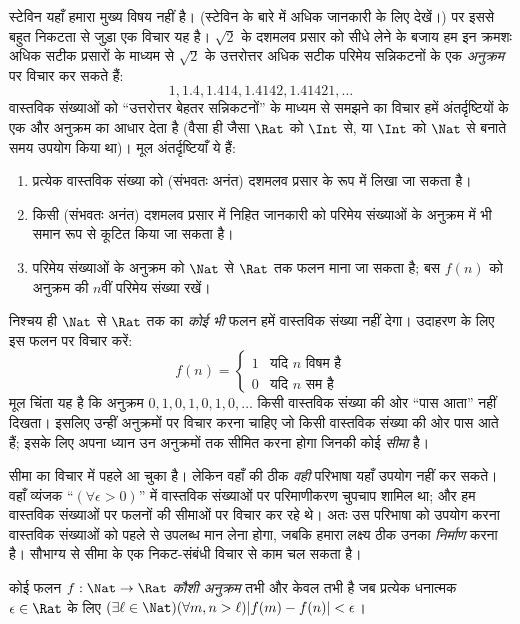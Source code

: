 \documentclass[../../../include/open-logic-section]{subfiles}
\begin{document}
स्टेविन यहाँ हमारा मुख्य विषय नहीं है। (स्टेविन के बारे में अधिक जानकारी के
लिए \citealt{KatzKatz2012} देखें।) पर इससे बहुत निकटता से जुड़ा एक विचार यह है।
$\sqrt{2}$ के दशमलव प्रसार को सीधे लेने के बजाय हम इन क्रमशः अधिक सटीक प्रसारों
के माध्यम से $\sqrt{2}$ के उत्तरोत्तर अधिक सटीक परिमेय सन्निकटनों के एक
\emph{अनुक्रम} पर विचार कर सकते हैं:
\[
1, 1.4, 1.414, 1.4142, 1.41421,\ldots
\]
वास्तविक संख्याओं को ``उत्तरोत्तर बेहतर सन्निकटनों'' के माध्यम से समझने का
विचार हमें अंतर्दृष्टियों के एक और अनुक्रम का आधार देता है (वैसा ही जैसा
$\Rat$ को $\Int$ से, या $\Int$ को $\Nat$ से बनाते समय उपयोग किया था)। मूल
अंतर्दृष्टियाँ ये हैं:
\begin{enumerate}
	\item प्रत्येक वास्तविक संख्या को (संभवतः अनंत) दशमलव प्रसार के रूप में
	लिखा जा सकता है।
	\item किसी (संभवतः अनंत) दशमलव प्रसार में निहित जानकारी को परिमेय संख्याओं
	के अनुक्रम में भी समान रूप से कूटित किया जा सकता है।
	\item परिमेय संख्याओं के अनुक्रम को $\Nat$ से $\Rat$ तक फलन माना जा सकता
	है; बस $f(n)$ को अनुक्रम की $n$वीं परिमेय संख्या रखें।
\end{enumerate}
निश्चय ही $\Nat$ से $\Rat$ तक का \emph{कोई भी} फलन हमें वास्तविक संख्या नहीं
देगा। उदाहरण के लिए इस फलन पर विचार करें:
\[
	f(n) =\begin{cases}
			1 & \text{यदि }n\text{ विषम है}\\
			0 &\text{यदि }n\text{ सम है}
		\end{cases}
\]
मूल चिंता यह है कि अनुक्रम $0,1,0,1,0,1,0,\ldots$ किसी वास्तविक संख्या की ओर
``पास आता'' नहीं दिखता। इसलिए उन्हीं अनुक्रमों पर विचार करना चाहिए जो किसी
वास्तविक संख्या की ओर पास आते हैं; इसके लिए अपना ध्यान उन अनुक्रमों तक सीमित
करना होगा जिनकी कोई \emph{सीमा} है।

सीमा का विचार  में पहले आ चुका है। लेकिन वहाँ की
ठीक \emph{वही} परिभाषा यहाँ उपयोग नहीं कर सकते। वहाँ व्यंजक
``$(\forall \epsilon>0)$'' में वास्तविक संख्याओं पर परिमाणीकरण चुपचाप शामिल
था; और हम वास्तविक संख्याओं पर फलनों की सीमाओं पर विचार कर रहे थे। अतः उस
परिभाषा को उपयोग करना वास्तविक संख्याओं को पहले से उपलब्ध मान लेना होगा, जबकि
हमारा लक्ष्य ठीक उनका \emph{निर्माण} करना है। सौभाग्य से सीमा के एक निकट-संबंधी
विचार से काम चल सकता है।
\begin{defn}
  कोई फलन $f: \Nat \to \Rat$ \emph{कौशी अनुक्रम} तभी और केवल तभी है जब
  प्रत्येक धनात्मक $\epsilon \in \Rat$ के लिए $(\exists \ell \in
  \Nat)(\forall m, n > \ell)|f(m) - f(n)| < \epsilon$।
\end{defn}
\end{document}
